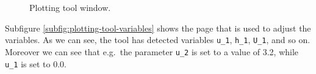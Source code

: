 \documentclass{article}
\begin{document}
\begin{figure}[ht]
  \centering
   \hspace{.3cm}
  \caption{Plotting tool window.}
  \label{fig:plotting-tool}
\end{figure}

Subfigure \ref{subfig:plotting-tool-variables} shows the page that is used to adjust the variables. As we can see, the tool has detected variables \texttt{u\_1}, \texttt{h\_1}, \texttt{U\_1}, and so on. Moreover we can see that e.g.\, the parameter \texttt{u\_2} is set to a value of 3.2, while \texttt{u\_1} is set to 0.0.
\end{document}
